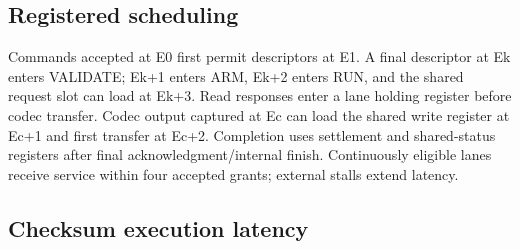\documentclass[11pt,a4paper]{article}
\begin{document}
\subsection{Regi\allowbreak{}ster\allowbreak{}ed sche\allowbreak{}duli\allowbreak{}ng}

Comm\allowbreak{}ands acce\allowbreak{}pted at E0 firs\allowbreak{}t perm\allowbreak{}it desc\allowbreak{}ript\allowbreak{}ors at E1. A fina\allowbreak{}l desc\allowbreak{}ript\allowbreak{}or at Ek ente\allowbreak{}rs VALI\allowbreak{}DATE; Ek+\allowbreak{}1 ente\allowbreak{}rs ARM,\allowbreak{} Ek+\allowbreak{}2 ente\allowbreak{}rs RUN,\allowbreak{} and the shar\allowbreak{}ed requ\allowbreak{}est slot can load at Ek+\allowbreak{}3. Read resp\allowbreak{}onse\allowbreak{}s ente\allowbreak{}r a lane hold\allowbreak{}ing regi\allowbreak{}ster befo\allowbreak{}re code\allowbreak{}c tran\allowbreak{}sfer. Code\allowbreak{}c outp\allowbreak{}ut capt\allowbreak{}ured at Ec can load the shar\allowbreak{}ed writ\allowbreak{}e regi\allowbreak{}ster at Ec+\allowbreak{}1 and firs\allowbreak{}t tran\allowbreak{}sfer at Ec+\allowbreak{}2. Comp\allowbreak{}leti\allowbreak{}on uses sett\allowbreak{}leme\allowbreak{}nt and shar\allowbreak{}ed-stat\allowbreak{}us regi\allowbreak{}ster\allowbreak{}s afte\allowbreak{}r fina\allowbreak{}l ackn\allowbreak{}owle\allowbreak{}dgme\allowbreak{}nt/\allowbreak{}inte\allowbreak{}rnal fini\allowbreak{}sh. Cont\allowbreak{}inuo\allowbreak{}usly elig\allowbreak{}ible lane\allowbreak{}s rece\allowbreak{}ive serv\allowbreak{}ice with\allowbreak{}in four acce\allowbreak{}pted gran\allowbreak{}ts; exte\allowbreak{}rnal stal\allowbreak{}ls exte\allowbreak{}nd late\allowbreak{}ncy.

\subsection{Chec\allowbreak{}ksum exec\allowbreak{}utio\allowbreak{}n late\allowbreak{}ncy}
\end{document}
